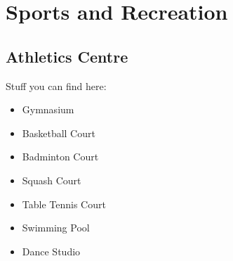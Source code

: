 \section{Sports and Recreation}

\subsection{Athletics Centre}

Stuff you can find here:

\begin{itemize}
    \item Gymnasium
    \item Basketball Court
    \item Badminton Court
    \item Squash Court
    \item Table Tennis Court
    \item Swimming Pool
    \item Dance Studio
\end{itemize}

